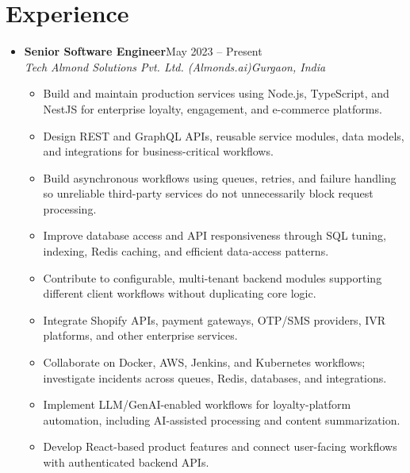 \documentclass[letterpaper,10pt]{article}
\newcommand{\itemx}[1]{\item\small{#1\vspace{-2pt}}}
\newcommand{\subheading}[4]{\item \textbf{#1}\hfill #2\\\textit{\small #3}\hfill\textit{\small #4}\vspace{-5pt}}
\begin{document}
\section{Experience}
\begin{itemize}[leftmargin=.15in,label={}]
\subheading{Senior Software Engineer}{May 2023 -- Present}{Tech Almond Solutions Pvt. Ltd. (Almonds.ai)}{Gurgaon, India}
\begin{itemize}[leftmargin=.18in]
\itemx{Build and maintain production services using Node.js, TypeScript, and NestJS for enterprise loyalty, engagement, and e-commerce platforms.}
\itemx{Design REST and GraphQL APIs, reusable service modules, data models, and integrations for business-critical workflows.}
\itemx{Build asynchronous workflows using queues, retries, and failure handling so unreliable third-party services do not unnecessarily block request processing.}
\itemx{Improve database access and API responsiveness through SQL tuning, indexing, Redis caching, and efficient data-access patterns.}
\itemx{Contribute to configurable, multi-tenant backend modules supporting different client workflows without duplicating core logic.}
\itemx{Integrate Shopify APIs, payment gateways, OTP/SMS providers, IVR platforms, and other enterprise services.}
\itemx{Collaborate on Docker, AWS, Jenkins, and Kubernetes workflows; investigate incidents across queues, Redis, databases, and integrations.}
\itemx{Implement LLM/GenAI-enabled workflows for loyalty-platform automation, including AI-assisted processing and content summarization.}
\itemx{Develop React-based product features and connect user-facing workflows with authenticated backend APIs.}
\end{itemize}
\end{itemize}
\end{document}
